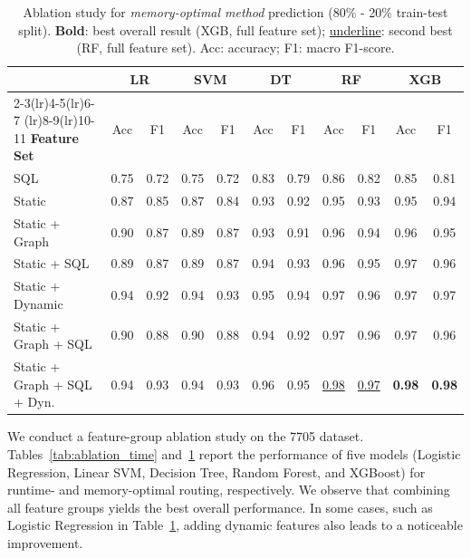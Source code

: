 
\begin{table}[!ht]
  \centering
  \caption{Ablation study for \emph{memory-optimal method} prediction
    (80\% - 20\% train-test split).
    \textbf{Bold}: best overall result (XGB, full feature set);
    \underline{underline}: second best (RF, full feature set).
    Acc: accuracy; F1: macro F1-score.}
  \label{tab:ablation_mem}
  \scriptsize
  \setlength{\tabcolsep}{3pt}
  \renewcommand{\arraystretch}{1.05}
  \begin{tabular}{l cc cc cc cc cc}
    \toprule
    & \multicolumn{2}{c}{\textbf{LR}}
    & \multicolumn{2}{c}{\textbf{SVM}}
    & \multicolumn{2}{c}{\textbf{DT}}
    & \multicolumn{2}{c}{\textbf{RF}}
    & \multicolumn{2}{c}{\textbf{XGB}} \\
    \cmidrule(lr){2-3}\cmidrule(lr){4-5}\cmidrule(lr){6-7}
    \cmidrule(lr){8-9}\cmidrule(lr){10-11}
    \textbf{Feature Set}
      & Acc & F1
      & Acc & F1
      & Acc & F1
      & Acc & F1
      & Acc & F1 \\
    \midrule
    SQL
      & 0.75 & 0.72
      & 0.75 & 0.72
      & 0.83 & 0.79
      & 0.86 & 0.82
      & 0.85 & 0.81 \\
    Static
      & 0.87 & 0.85
      & 0.87 & 0.84
      & 0.93 & 0.92
      & 0.95 & 0.93
      & 0.95 & 0.94 \\
    Static + Graph
      & 0.90 & 0.87
      & 0.89 & 0.87
      & 0.93 & 0.91
      & 0.96 & 0.94
      & 0.96 & 0.95 \\
    Static + SQL
      & 0.89 & 0.87
      & 0.89 & 0.87
      & 0.94 & 0.93
      & 0.96 & 0.95
      & 0.97 & 0.96 \\
    Static + Dynamic
      & 0.94 & 0.92
      & 0.94 & 0.93
      & 0.95 & 0.94
      & 0.97 & 0.96
      & 0.97 & 0.97 \\
    Static + Graph + SQL
      & 0.90 & 0.88
      & 0.90 & 0.88
      & 0.94 & 0.92
      & 0.97 & 0.96
      & 0.97 & 0.96 \\
    Static + Graph + SQL + Dyn.
      & 0.94 & 0.93
      & 0.94 & 0.93
      & 0.96 & 0.95
      & \underline{0.98} & \underline{0.97}
      & \textbf{0.98} & \textbf{0.98} \\
    \bottomrule
  \end{tabular}
\end{table}


We conduct a feature-group ablation study on the 7705 dataset. 
Tables~\ref{tab:ablation_time} and~\ref{tab:ablation_mem} report the performance of five models (Logistic Regression, Linear SVM, Decision Tree, Random Forest, and XGBoost) for runtime- and memory-optimal routing, respectively. 
We observe that combining all feature groups yields the best overall performance. 
In some cases, such as Logistic Regression in Table~\ref{tab:ablation_mem}, adding dynamic features also leads to a noticeable improvement.




